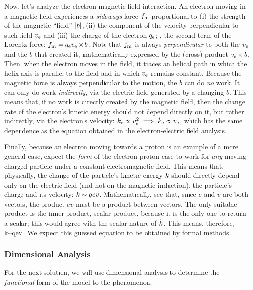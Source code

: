 Now, let's analyze the electron-magnetic field interaction. An electron moving in a magnetic field experiences a \emph{sideways} force $f_\text{m}$ proportional to (i) the strength of the magnetic ``field'' $\lvert{b}\rvert$, (ii) the component of the velocity perpendicular to such field $v_\text{e}$ and (iii) the charge of the electron $q_\text{e}$; \ie, the second term of the Lorentz force: $f_\text{m} = q_\text{e}v_\text{e}\operatorname{\times} b$. Note that $f_\text{m}$ is always \emph{perpendicular} to both the $v_\text{e}$ and the $b$ that created it, mathematically expressed by the (cross) product $v_\text{e}\operatorname{\times} b$. Then, when the electron moves in the field, it traces an helical path in which the helix axis is parallel to the field and in which $v_\text{e}$ remains constant. Because the magnetic force is always perpendicular to the motion, the $b$ can do \emph{no} work. It can only do work \emph{indirectly}, via the electric field generated by a changing $b$. This means that, if no work is directly created by the magnetic field, then the change rate of the electron's kinetic energy should not depend directly on it, but rather indirectly, via the electron's velocity: $k_\text{e}\propto v_\text{e}^2\implies\dot{k}_\text{e}\propto v_\text{e}$, which has the same dependence as the equation obtained in the electron-electric field analysis.

Finally, because an electron moving towards a proton is an example of a more general case, expect the \emph{form} of the electron-proton case to work for \emph{any} moving charged particle under a constant electromagnetic field. This means that, physically, the change of the particle's kinetic energy $\dot{k}$ should directly depend only on the electric field (and not on the magnetic induction), the particle's charge and its velocity: $\dot{k}\sim qev$. Mathematically, see that, since $e$ and $v$ are both vectors, the product $ev$ must be a product between vectors. The only suitable product is the inner product, \aka scalar product, because it is the only one to return a scalar; this would agree with the scalar nature of $\dot{k}$. This means, therefore,
\beq
\dt k\sim qe\iprod v\,.
\eeq
We expect this guessed equation to be obtained by formal methods.


\subsubsection{Dimensional Analysis}
For the next solution, we will use dimensional analysis to determine the \emph{functional} form of the model to the phenomenon.


